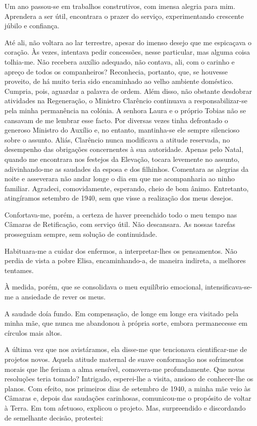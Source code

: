 \documentclass[portuguese,12pt,a4paper]{scrbook}
\begin{document}
	Um ano passou-se em trabalhos construtivos, com imensa alegria para mim. Aprendera a ser útil, encontrara o prazer do serviço, experimentando crescente júbilo e confiança.
	
	Até ali, não voltara ao lar terrestre, apesar do imenso desejo que me espicaçava o coração. Às vezes, intentava pedir concessões, nesse particular, mas alguma coisa tolhia-me. Não recebera auxílio adequado, não contava, ali, com o carinho e apreço de todos os companheiros? Reconhecia, portanto, que, se houvesse proveito, de há muito teria sido encaminhado ao velho ambiente doméstico. Cumpria, pois, aguardar a palavra de ordem. Além disso, não obstante desdobrar atividades na Regeneração, o Ministro Clarêncio continuava a responsabilizar-se pela minha permanência na colónia. A senhora Laura e o próprio Tobias não se cansavam de me lembrar esse facto. Por diversas vezes tinha defrontado o generoso Ministro do Auxílio e, no entanto, mantinha-se ele sempre silencioso sobre o assunto. Aliás, Clarêncio nunca modificava a atitude reservada, no desempenho das obrigações concernentes à sua autoridade. Apenas pelo Natal, quando me encontrara nos festejos da Elevação, tocara levemente no assunto, adivinhando-me as saudades da esposa e dos filhinhos. Comentara as alegrias da noite e asseverara não andar longe o dia em que me acompanharia ao ninho familiar. Agradeci, comovidamente, esperando, cheio de bom ânimo. Entretanto, atingíramos setembro de 1940, sem que visse a realização dos meus desejos.
	
	Confortava-me, porém, a certeza de haver preenchido todo o meu tempo nas Câmaras de Retificação, com serviço útil. Não descansara. As nossas tarefas prosseguiam sempre, sem solução de continuidade.
	
	
	Habituara-me a cuidar dos enfermos, a interpretar-lhes os pensamentos. Não perdia de vista a pobre Elisa, encaminhando-a, de maneira indireta, a melhores tentames.
	
	À medida, porém, que se consolidava o meu equilíbrio emocional, intensificava-se-me a ansiedade de rever os meus.
	
	A saudade doía fundo. Em compensação, de longe em longe era visitado pela minha mãe, que nunca me abandonou à própria sorte, embora permanecesse em círculos mais altos.
	
	A última vez que nos avistáramos, ela disse-me que tencionava cientificar-me de projetos novos. Aquela atitude maternal de suave conformação nos sofrimentos morais que lhe feriam a alma sensível, comovera-me profundamente. Que novas resoluções teria tomado? Intrigado, esperei-lhe a visita, ansioso de conhecer-lhe os planos. Com efeito, nos primeiros dias de setembro de 1940, a minha mãe veio às Câmaras e, depois das saudações carinhosas, comunicou-me o propósito de voltar à Terra. Em tom afetuoso, explicou o projeto. Mas, surpreendido e discordando de semelhante decisão, protestei:
	
\end{document}
